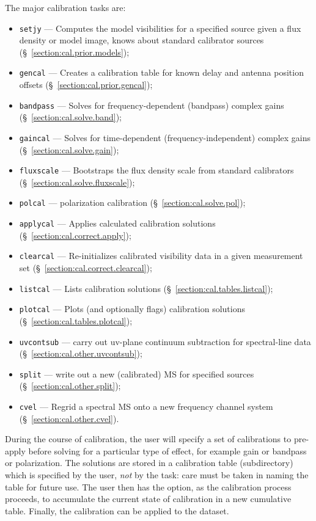 The major calibration tasks are:
\begin{itemize}
   \item {\tt setjy} --- Computes the model visibilities for a specified source
         given a flux density or model image, knows about standard
         calibrator sources (\S~\ref{section:cal.prior.models});
   \item {\tt gencal} --- Creates a calibration table for known delay
         and antenna position offsets
         (\S~\ref{section:cal.prior.gencal});
   \item {\tt bandpass} --- Solves for frequency-dependent (bandpass) complex
         gains (\S~\ref{section:cal.solve.band});
   \item {\tt gaincal} --- Solves for time-dependent
         (frequency-independent) complex gains 
         (\S~\ref{section:cal.solve.gain});
   \item {\tt fluxscale} --- Bootstraps the flux density scale from standard
         calibrators (\S~\ref{section:cal.solve.fluxscale});
   \item {\tt polcal} --- polarization calibration
         (\S~\ref{section:cal.solve.pol});
   \item {\tt applycal} --- Applies calculated calibration solutions 
         (\S~\ref{section:cal.correct.apply});
   \item {\tt clearcal} --- Re-initializes calibrated visibility data 
         in a given measurement set (\S~\ref{section:cal.correct.clearcal});
   \item {\tt listcal} --- Lists calibration solutions 
         (\S~\ref{section:cal.tables.listcal});
   \item {\tt plotcal} --- Plots (and optionally flags) calibration
         solutions (\S~\ref{section:cal.tables.plotcal});
   \item {\tt uvcontsub} --- carry out uv-plane continuum subtraction
         for spectral-line data (\S~\ref{section:cal.other.uvcontsub});
   \item {\tt split} --- write out a new (calibrated) MS for specified
         sources (\S~\ref{section:cal.other.split});
   \item {\tt cvel} --- Regrid a spectral MS onto a new frequency
         channel system (\S~\ref{section:cal.other.cvel}).
\end{itemize}

During the course of calibration, the user will specify a set of
calibrations to pre-apply before solving for a particular type of
effect, for example gain or bandpass or polarization.  The solutions
are stored in a calibration table (subdirectory) which is specified by
the user, {\it not} by the task: care must be taken in naming the
table for future use.  The user then has the option, as the
calibration process proceeds, to accumulate the current state of 
calibration in a new cumulative table.  Finally, the calibration can
be applied to the dataset.

